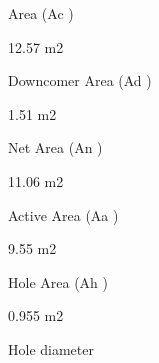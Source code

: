 \documentclass[a4paper,portrait,12pt]{article}
\begin{document}
\begin{flushleft}
Area (Ac )
\end{flushleft}





\begin{flushleft}
12.57 m2
\end{flushleft}





\begin{flushleft}
Downcomer Area (Ad )
\end{flushleft}





\begin{flushleft}
1.51 m2
\end{flushleft}





\begin{flushleft}
Net Area (An )
\end{flushleft}





\begin{flushleft}
11.06 m2
\end{flushleft}





\begin{flushleft}
Active Area (Aa )
\end{flushleft}





\begin{flushleft}
9.55 m2
\end{flushleft}





\begin{flushleft}
Hole Area (Ah )
\end{flushleft}





\begin{flushleft}
0.955 m2
\end{flushleft}





\begin{flushleft}
Hole diameter
\end{flushleft}
\end{document}
